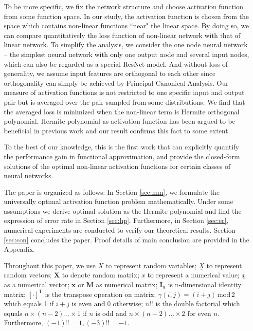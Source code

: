 \documentclass[conference]{IEEEtran}
\def\T{\mathrm{T}}
\newcommand{\ide}[2]{ \gamma(#1,#2) }
\begin{document}
To be more specific, we fix the network structure and choose activation function from some function space.
In our study, the activation function is chosen from the space which contains non-linear functions ``near" the linear space.
By doing so, we can compare quantitatively the loss function of non-linear network with that of linear network.
To simplify the analysis, we consider the one node neural network -- the simplest neural network with only one output node and several input nodes, which can also be regarded as a special ResNet model.
And without loss of generality, we assume input features are orthogonal to each other since orthogonality can simply be achieved by Principal Canonical Analysis.
Our measure of activation functions is not restricted to one specific input and output pair but is averaged over the pair sampled from some distributions.
We find that the averaged loss is minimized when the non-linear term is Hermite orthogonal polynomial.
Hermite polynomial as activation function has been argued to be beneficial in previous work \cite{ma2005constructive} and our result confirms this fact to some extent.


To the best of our knowledge, this is the first work that can explicitly quantify the performance gain in functional approximation, and provide the closed-form solutions of the optimal non-linear activation functions for certain classes of neural networks.

The paper is organized as follows: In Section \ref{sec:mm}, we formulate the universally optimal activation function problem
mathematically.
Under some assumptions we derive optimal solution as the Hermite polynomial and find the expression of error rate in Section \ref{sec:hp}.
Furthermore, in Section \ref{sec:er}, numerical experiments are conducted to verify our theoretical results.
Section \ref{sec:con} concludes the paper. Proof details of main conclusion are provided in the Appendix.

Throughout this paper, we use $X$ to represent random variables;
$\underline{X}$ to represent random vectors;
$\bm{X}$ to denote random matrix;
$x$ to represent a numerical value;
$\underline{x}$ as a numerical vector;
$\bm{x}$  or $\mathbf{M}$ as numerical matrix; $\mathbf{I}_n$ is n-dimensional identity matrix;
$[\cdot]^\T$ is the transpose operation on matrix; $\ide{i}{j} = (i+j)\, \mathrm{mod} \, 2$
which equals 1 if $ i + j$ is even and 0 otherwise;
$n!!$ is the double factorial which equals $n \times (n-2) \dots \times1$ if $n$ is odd and $n \times (n-2)\dots \times 2$ for even $n$. Furthermore, $(-1)!!=1,(-3)!!=-1$.
\end{document}
